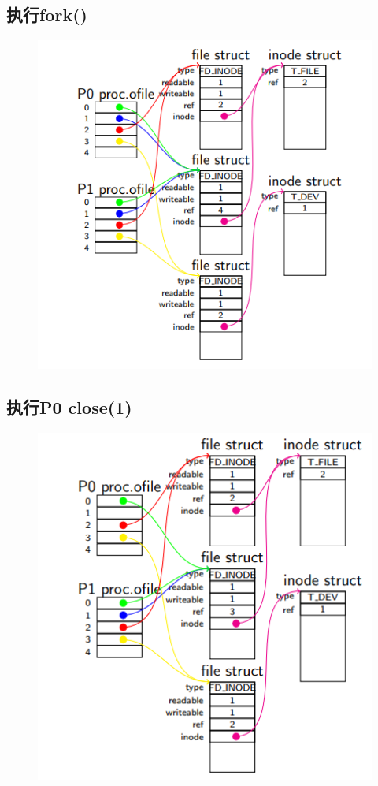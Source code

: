 \documentclass[a4paper,12pt]{report}
\begin{document}
\subsection{ 	执行fork()}
\begin{figure}[H]
	\centering
	\includegraphics [width=1.0\textwidth]{figure//image163.png}
\end{figure}


\subsection{ 	执行P0 close(1)}
\begin{figure}[H]
	\centering
	\includegraphics [width=1.0\textwidth]{figure//image164.png}
\end{figure}
\end{document}
